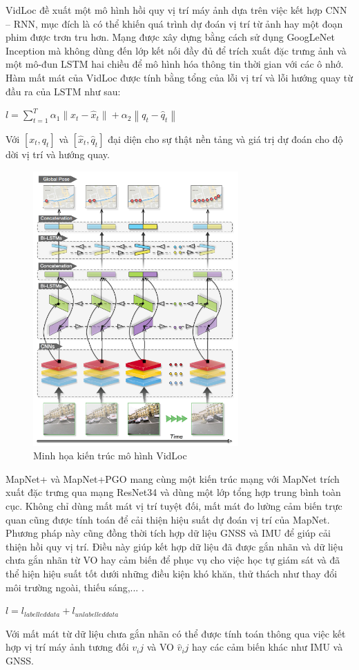 VidLoc \cite{clark2017vidloc} đề xuất một mô hình hồi quy vị trí máy ảnh dựa trên việc kết hợp CNN – RNN, mục đích là có thể khiến quá trình dự đoán vị trí từ ảnh hay một đoạn phim được trơn tru hơn. Mạng được xây dựng bằng cách sử dụng GoogLeNet Inception \cite{szegedy2014going} mà không dùng đến lớp kết nối đầy đủ để trích xuất đặc trưng ảnh và một mô-đun LSTM hai chiều để mô hình hóa thông tin thời gian với các ô nhớ.  Hàm mất mát của VidLoc được tính bằng tổng của lỗi vị trí và lỗi hướng quay từ đầu ra của LSTM như sau:
\begin{center}
    $ l = \sum_{t=1}^T \alpha_1 \left \| x_t - \hat{x}_t \right \| + \alpha_2 \left \| q_t - \hat{q}_t \right \| $
\end{center}
Với $[x_t, q_t]$ và $[\hat{x}_t, \hat{q}_t]$ đại diện cho sự thật nền tảng và giá trị dự đoán cho độ dời vị trí và hướng quay.
\begin{figure}[H]
    \centering
    \includegraphics[width=0.7\textwidth]{pics/Chapter2/vidloc.png}
    \caption{Minh họa kiến trúc mô hình VidLoc \cite{clark2017vidloc}}
\end{figure}
MapNet+ và MapNet+PGO \cite{brahmbhatt2018geometryaware} mang cùng một kiến trúc mạng với MapNet trích xuất đặc trưng qua mạng ResNet34 và dùng một lớp tổng hợp trung bình toàn cục. Không chỉ dùng mất mát vị trí tuyệt đối, mất mát đo lường cảm biến trực quan cũng được tính toán để cải thiện hiệu suất dự đoán vị trí của MapNet. Phương pháp này cũng đồng thời tích hợp dữ liệu GNSS và IMU để giúp cải thiện hồi quy vị trí. Điều này giúp kết hợp dữ liệu đã được gắn nhãn và dữ liệu chưa gắn nhãn từ VO hay cảm biến để phục vụ cho việc học tự giám sát và đã thể hiện hiệu suất tốt dưới những điều kiện khó khăn, thử thách như thay đổi môi trường ngoài, thiếu sáng,... .
\begin{center}
    $l = l_{labelled data} + l_{unlabelled data}$
\end{center}
Với mất mát từ dữ liệu chưa gắn nhãn có thể được tính toán thông qua việc kết hợp vị trí máy ảnh tương đối $v_ij$ và VO $\hat{v}_ij$ hay các cảm biến khác như IMU và GNSS.

